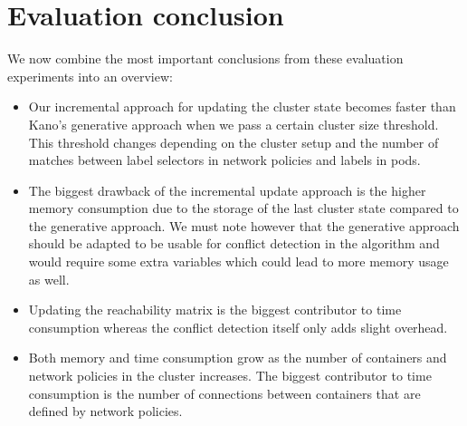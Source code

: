 \section{Evaluation conclusion} \label{sec:conclusion}
We now combine the most important conclusions from these evaluation experiments into an overview:
\begin{itemize}
	\item Our incremental approach for updating the cluster state becomes faster than Kano's generative approach when we pass a certain cluster size threshold. This threshold changes depending on the cluster setup and the number of matches between label selectors in network policies and labels in pods. 
	\item The biggest drawback of the incremental update approach is the higher memory consumption due to the storage of the last cluster state compared to the generative approach. We must note however that the generative approach should be adapted to be usable for conflict detection in the algorithm and would require some extra variables which could lead to more memory usage as well.
	\item Updating the reachability matrix is the biggest contributor to time consumption whereas the conflict detection itself only adds slight overhead.
	\item Both memory and time consumption grow as the number of containers and network policies in the cluster increases. The biggest contributor to time consumption is the number of connections between containers that are defined by network policies.
\end{itemize}

\cleardoublepage
